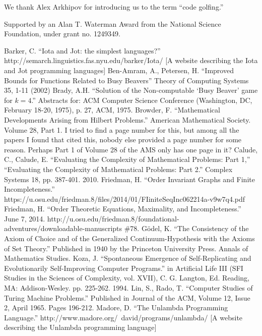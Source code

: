 \documentclass[11pt]{article}
\begin{document}
We thank Alex Arkhipov for introducing us to the term ``code golfing.''

Supported by an Alan T. Waterman Award from the National Science Foundation, under grant no. 1249349.

\begin{thebibliography}{100}
 Barker, C. ``Iota and Jot: the simplest languages?'' http://semarch.linguistics.fas.nyu.edu/barker/Iota/ [A website describing the Iota and Jot programming languages]
 Ben-Amram, A., Petersen, H. ``Improved Bounds for Functions Related to Busy Beavers'' Theory of Computing Systems 35, 1-11 (2002) 
 Brady, A.H. ``Solution of the Non-computable `Busy Beaver' game for $k=4$.'' Abstracts for: ACM Computer Science Conference (Washington, DC, February 18-20, 1975), p. 27, ACM, 1975.
 Browder, F. ``Mathematical Developments Arising from Hilbert Problems.'' American Mathematical Society. Volume 28, Part 1. {\color{red} I tried to find a page number for this, but among all the papers I found that cited this, nobody else provided a page number for some reason. Perhaps Part 1 of Volume 28 of the AMS only has one page in it?}
 Calude, C., Calude, E. ``Evaluating the Complexity of Mathematical Problems: Part 1,'' ``Evaluating the Complexity of Mathematical Problems: Part 2.'' Complex Systems 18, pp. 387-401. 2010.
 Friedman, H. ``Order Invariant Graphs and Finite Incompleteness.'' https://u.osu.edu/friedman.8/files/2014/01/FIiniteSeqInc062214a-v9w7q4.pdf
 Friedman, H. ``Order Theoretic Equations, Maximality, and Incompleteness.'' June 7, 2014. http://u.osu.edu/friedman.8/foundational-adventures/downloadable-manuscripts \#78.
 G\"odel, K. ``The Consistency of the Axiom of Choice and of the Generalized Continuum-Hypothesis with the Axioms of Set Theory.'' Published in 1940 by the Princeton University Press. Annals of Mathematics Studies.
 Koza, J. ``Spontaneous Emergence of Self-Replicating and Evolutionarily Self-Improving Computer Programs.'' in Artificial Life III (SFI Studies in the Sciences of Complexity, vol. XVII), C. G. Langton, Ed. Reading, MA: Addison-Wesley. pp. 225-262. 1994. 
 Lin, S., Rado, T. ``Computer Studies of Turing Machine Problems.'' Published in Journal of the ACM, Volume 12, Issue 2, April 1965. Pages 196-212.
 Madore, D. ``The Unlambda Programming Language.'' http://www.madore.org/~david/programs/unlambda/ [A website describing the Unlambda programming language]

\end{thebibliography}
\end{document}
